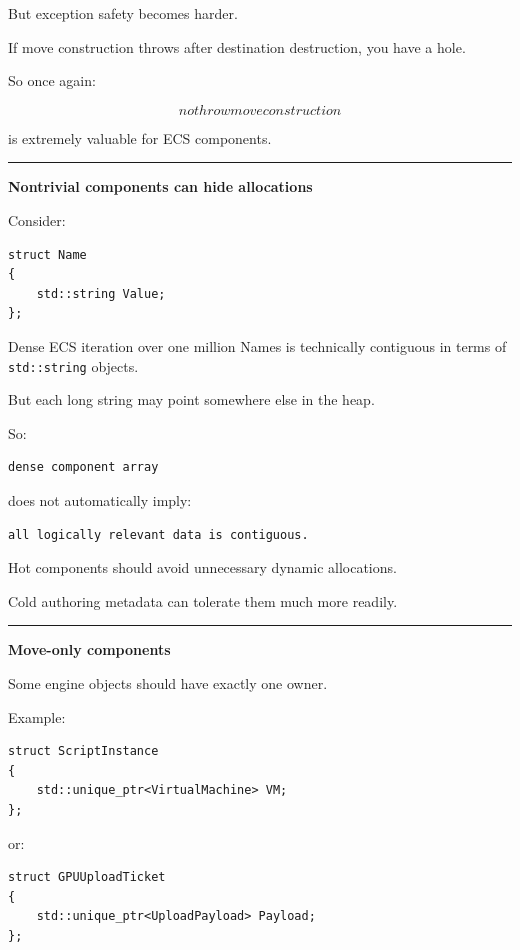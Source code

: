 But exception safety becomes harder.

If move construction throws after destination destruction, you have a hole.

So once again:

\[
\boxed{
nothrow move construction
}
\]

is extremely valuable for ECS components.

\begin{center}\rule{0.5\linewidth}{0.5pt}\end{center}

\textbf{Nontrivial components can hide allocations}

Consider:

\begin{verbatim}
struct Name
{
    std::string Value;
};
\end{verbatim}

Dense ECS iteration over one million Names is technically contiguous in terms of \texttt{std::string} objects.

But each long string may point somewhere else in the heap.

So:

\begin{verbatim}
dense component array
\end{verbatim}

does not automatically imply:

\begin{verbatim}
all logically relevant data is contiguous.
\end{verbatim}

Hot components should avoid unnecessary dynamic allocations.

Cold authoring metadata can tolerate them much more readily.

\begin{center}\rule{0.5\linewidth}{0.5pt}\end{center}

\textbf{Move-only components}

Some engine objects should have exactly one owner.

Example:

\begin{verbatim}
struct ScriptInstance
{
    std::unique_ptr<VirtualMachine> VM;
};
\end{verbatim}

or:

\begin{verbatim}
struct GPUUploadTicket
{
    std::unique_ptr<UploadPayload> Payload;
};
\end{verbatim}

